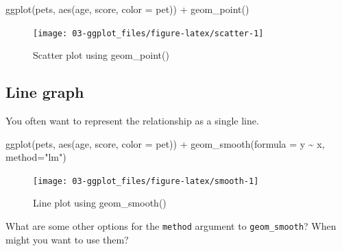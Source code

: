 \documentclass[
  oneside]{book}
\newenvironment{Shaded}{\begin{snugshade}}{\end{snugshade}}
\newcommand{\AttributeTok}[1]{\textcolor[rgb]{0.77,0.63,0.00}{#1}}
\newcommand{\FunctionTok}[1]{\textcolor[rgb]{0.00,0.00,0.00}{#1}}
\newcommand{\NormalTok}[1]{#1}
\newcommand{\SpecialCharTok}[1]{\textcolor[rgb]{0.00,0.00,0.00}{#1}}
\newcommand{\StringTok}[1]{\textcolor[rgb]{0.31,0.60,0.02}{#1}}
\begin{document}
\begin{Shaded}
\begin{Highlighting}[]
\FunctionTok{ggplot}\NormalTok{(pets, }\FunctionTok{aes}\NormalTok{(age, score, }\AttributeTok{color =}\NormalTok{ pet)) }\SpecialCharTok{+}
  \FunctionTok{geom\_point}\NormalTok{()}
\end{Highlighting}
\end{Shaded}

\begin{figure}

{\centering \texttt{[image: 03-ggplot\_files/figure-latex/scatter-1]} 

}

\caption{Scatter plot using geom_point()}\label{fig:scatter}
\end{figure}

\hypertarget{geom_smooth}{%
\subsection{Line graph}\label{geom_smooth}}

You often want to represent the relationship as a single line.

\begin{Shaded}
\begin{Highlighting}[]
\FunctionTok{ggplot}\NormalTok{(pets, }\FunctionTok{aes}\NormalTok{(age, score, }\AttributeTok{color =}\NormalTok{ pet)) }\SpecialCharTok{+}
  \FunctionTok{geom\_smooth}\NormalTok{(}\AttributeTok{formula =}\NormalTok{ y }\SpecialCharTok{\textasciitilde{}}\NormalTok{ x, }\AttributeTok{method=}\StringTok{"lm"}\NormalTok{)}
\end{Highlighting}
\end{Shaded}

\begin{figure}

{\centering \texttt{[image: 03-ggplot\_files/figure-latex/smooth-1]} 

}

\caption{Line plot using geom_smooth()}\label{fig:smooth}
\end{figure}

\begin{try}
What are some other options for the \texttt{method} argument to \texttt{geom\_smooth}? When might you want to use them?

\end{try}
\end{document}
